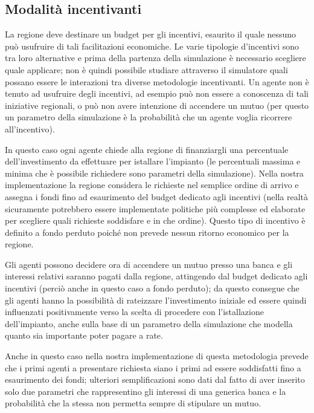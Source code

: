\subsection{Modalità incentivanti}

La regione deve destinare un budget per gli incentivi, esaurito il quale nessuno può usufruire di tali facilitazioni economiche. Le varie tipologie d’incentivi sono tra loro alternative e prima della partenza della simulazione è necessario scegliere quale applicare; non è quindi possibile studiare attraverso il simulatore quali possano essere le interazioni tra diverse metodologie incentivanti. Un agente non è tenuto ad usufruire degli incentivi, ad esempio può non essere a conoscenza di tali iniziative regionali, o può non avere intenzione di accendere un mutuo (per questo un parametro della simulazione è la probabilità che un agente voglia ricorrere all’incentivo).


In questo caso ogni agente chiede alla regione di finanziargli una percentuale dell'investimento da effettuare per istallare l'impianto (le percentuali massima e minima che è possibile richiedere sono parametri della simulazione). Nella nostra implementazione la regione considera le richieste nel semplice ordine di arrivo e assegna i fondi fino ad esaurimento del budget dedicato agli incentivi (nella realtà sicuramente potrebbero essere implementate politiche più complesse ed elaborate per scegliere quali richieste soddisfare e in che ordine). Questo tipo di incentivo è definito a fondo perduto poiché non prevede nessun ritorno economico per la regione.


Gli agenti possono decidere ora di accendere un mutuo presso una banca e gli interessi relativi saranno pagati dalla regione, attingendo dal budget dedicato agli incentivi (perciò anche in questo caso a fondo perduto); da questo consegue che gli agenti hanno la possibilità di rateizzare l'investimento iniziale ed essere quindi influenzati positivamente verso la scelta di procedere con l'istallazione dell'impianto, anche sulla base di un parametro della simulazione che modella quanto sia importante poter pagare a rate.

Anche in questo caso nella nostra implementazione di questa metodologia prevede che i primi agenti a presentare richiesta siano i primi ad essere soddisfatti fino a esaurimento dei fondi; ulteriori semplificazioni sono dati dal fatto di aver inserito solo due parametri che rappresentino gli interessi di una generica banca e la probabilità che la stessa non permetta sempre di stipulare un mutuo.

